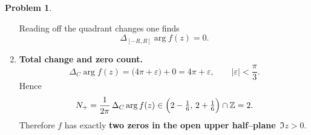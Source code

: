 \documentclass[12pt]{article}
\theoremstyle{definition} %
\newtheorem{problem}{Problem}
\theoremstyle{plain} %
\begin{document}
\begin{problem}
\begin{enumerate}
              Reading off the quadrant changes one finds
              \[
                  \Delta_{[-R,R]}\arg f(z)=0.
              \]

        \item \textbf{Total change and zero count.}\;
              \[
                  \Delta_{C}\arg f(z)=\bigl(4\pi+\varepsilon\bigr)+0
                                      =4\pi+\varepsilon,
                  \qquad |\varepsilon|<\frac{\pi}{3}.
              \]
              Hence
              \[
                  N_{+}
                  =\frac{1}{2\pi}\,\Delta_{C}\arg f(z)
                  \in\Bigl(2-\tfrac16,\,2+\tfrac16\Bigr)\cap\mathbb Z
                  =2.
              \]
              Therefore $f$ has exactly \textbf{two zeros in the open upper
              half–plane} $\Im z>0$.
    \end{enumerate}
\end{problem}
\end{document}
